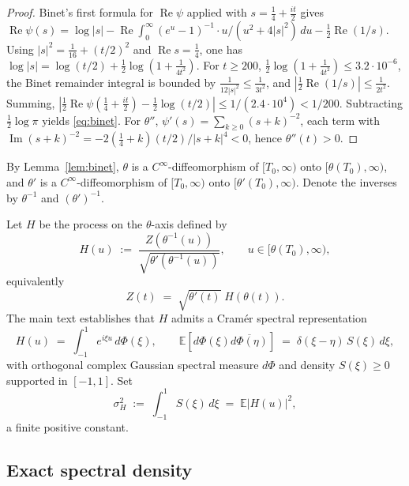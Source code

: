 \documentclass[11pt]{amsart}
\theoremstyle{definition}
\DeclareMathOperator{\ImOp}{Im}
\DeclareMathOperator{\ReOp}{Re}
\let\Im\ImOp
\let\Re\ReOp
\begin{document}
\begin{proof}
Binet's first formula for $\Re\psi$ applied with $s=\tfrac14+\tfrac{it}{2}$
gives $\Re\psi(s)=\log|s|-\Re\!\int_{0}^{\infty}(e^{u}-1)^{-1}\cdot u/(u^{2}+4|s|^{2})\,du-\tfrac12\Re(1/s)$.
Using $|s|^{2}=\tfrac{1}{16}+(t/2)^{2}$ and $\Re s=\tfrac14$, one has
$\log|s|=\log(t/2)+\tfrac12\log(1+\tfrac{1}{4t^{2}})$. For $t\ge 200$,
$\tfrac12\log(1+\tfrac{1}{4t^{2}})\le 3.2\cdot 10^{-6}$, the Binet remainder
integral is bounded by $\tfrac{1}{12|s|^{2}}\le\tfrac{1}{3t^{2}}$, and
$|\tfrac12\Re(1/s)|\le\tfrac{1}{2t^{2}}$. Summing,
$|\tfrac12\Re\psi(\tfrac14+\tfrac{it}{2})-\tfrac12\log(t/2)|\le 1/(2.4\cdot 10^{4})<1/200$.
Subtracting $\tfrac12\log\pi$ yields \eqref{eq:binet}. For $\theta''$,
$\psi'(s)=\sum_{k\ge 0}(s+k)^{-2}$, each term with
$\Im(s+k)^{-2}=-2(\tfrac14+k)(t/2)/|s+k|^{4}<0$, hence $\theta''(t)>0$.
\end{proof}

By Lemma~\ref{lem:binet}, $\theta$ is a $C^{\infty}$-diffeomorphism of
$[T_{0},\infty)$ onto $[\theta(T_{0}),\infty)$, and $\theta'$ is a
$C^{\infty}$-diffeomorphism of $[T_{0},\infty)$ onto $[\theta'(T_{0}),\infty)$.
Denote the inverses by $\theta^{-1}$ and $(\theta')^{-1}$.

Let $H$ be the process on the $\theta$-axis defined by
\begin{equation}\label{eq:Hdef}
H(u) \;:=\; \frac{Z(\theta^{-1}(u))}{\sqrt{\theta'(\theta^{-1}(u))}},
\qquad u\in[\theta(T_{0}),\infty),
\end{equation}
equivalently
\begin{equation}\label{eq:Zfromh}
Z(t) \;=\; \sqrt{\theta'(t)}\;H(\theta(t)).
\end{equation}
The main text establishes that $H$ admits a Cram\'er spectral representation
\begin{equation}\label{eq:cramer}
H(u) \;=\; \int_{-1}^{1} e^{i\xi u}\,d\Phi(\xi),
\qquad \mathbb{E}\!\left[d\Phi(\xi)\overline{d\Phi(\eta)}\right]
\;=\; \delta(\xi-\eta)\,S(\xi)\,d\xi,
\end{equation}
with orthogonal complex Gaussian spectral measure $d\Phi$ and density
$S(\xi)\ge 0$ supported in $[-1,1]$. Set
\begin{equation}\label{eq:sigmaH}
\sigma_{H}^{2} \;:=\; \int_{-1}^{1}S(\xi)\,d\xi \;=\; \mathbb{E}|H(u)|^{2},
\end{equation}
a finite positive constant.

\subsection{Exact spectral density}\label{sub:spec}
\end{document}
